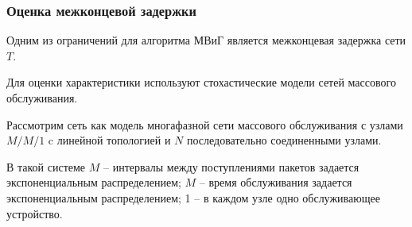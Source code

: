 \begin{frame}
    \justifying
    \frametitle{Оценка межконцевой задержки}
    \fontsize{8pt}{7.2}\selectfont

    Одним из ограничений для алгоритма МВиГ является межконцевая задержка сети $T$.
    \bigskip

    Для оценки характеристики используют стохастические модели сетей массового обслуживания.

    \bigskip

    {Рассмотрим сеть как модель многафазной сети массового обслуживания  с узлами $M/M/1$ c линейной топологией и $N$ последовательно соединенными узлами. 

    \bigskip

    В такой системе $M$ -- интервалы между поступлениями пакетов задается экспоненциальным распределением; $M$ --  время обслуживания задается экспоненциальным распределением; 1 -- в каждом узле одно обслуживающее устройство.}

   
\end{frame}




    





    
